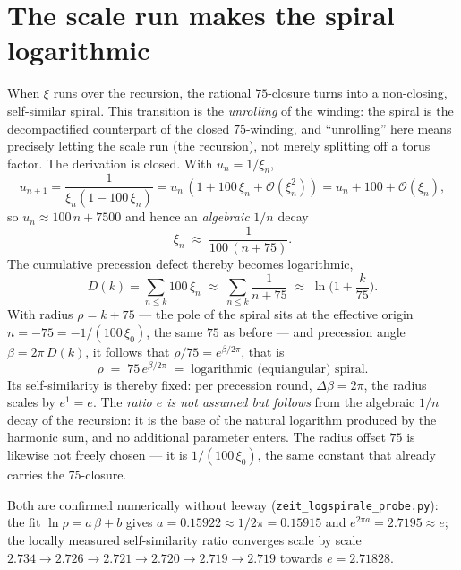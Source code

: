 \section{The scale run makes the spiral logarithmic}
When $\xi$ runs over the recursion, the rational $75$-closure turns into a non-closing,
self-similar spiral. This transition is the \emph{unrolling} of the winding: the spiral is the
decompactified counterpart of the closed $75$-winding, and \enquote{unrolling} here means
precisely letting the scale run (the recursion), not merely splitting off a torus factor. The
derivation is closed. With $u_n=1/\xi_n$,
\begin{equation}
  u_{n+1}=\frac{1}{\xi_n(1-100\,\xi_n)}=u_n\,(1+100\,\xi_n+\mathcal{O}(\xi_n^2))
         =u_n+100+\mathcal{O}(\xi_n),
\end{equation}
so $u_n\approx 100\,n+7500$ and hence an \emph{algebraic} $1/n$ decay
\begin{equation}
  \xi_n\;\approx\;\frac{1}{100\,(n+75)} .
\end{equation}
The cumulative precession defect thereby becomes logarithmic,
\begin{equation}
  D(k)=\sum_{n\le k}100\,\xi_n\;\approx\;\sum_{n\le k}\frac{1}{n+75}
       \;\approx\;\ln\!\Big(1+\frac{k}{75}\Big).
\end{equation}
With radius $\rho=k+75$ --- the pole of the spiral sits at the effective origin
$n=-75=-1/(100\,\xi_0)$, the same $75$ as before --- and precession angle $\beta=2\pi\,D(k)$, it
follows that $\rho/75=e^{\beta/2\pi}$, that is
\begin{equation}
  \rho\;=\;75\,e^{\beta/2\pi}\;=\;\text{logarithmic (equiangular) spiral.}
\end{equation}
Its self-similarity is thereby fixed: per precession round, $\Delta\beta=2\pi$, the radius scales
by $e^{1}=e$. The \emph{ratio $e$ is not assumed but follows} from the algebraic $1/n$ decay of
the recursion: it is the base of the natural logarithm produced by the harmonic sum, and no
additional parameter enters. The radius offset $75$ is likewise not freely chosen --- it is
$1/(100\,\xi_0)$, the same constant that already carries the $75$-closure.

Both are confirmed numerically without leeway (\texttt{zeit\_logspirale\_probe.py}): the fit
$\ln\rho=a\,\beta+b$ gives $a=0{.}15922\approx 1/2\pi=0{.}15915$ and $e^{2\pi a}=2{.}7195\approx e$;
the locally measured self-similarity ratio converges scale by scale
$2{.}734\to2{.}726\to2{.}721\to2{.}720\to2{.}719\to2{.}719$ towards $e=2{.}71828$.

